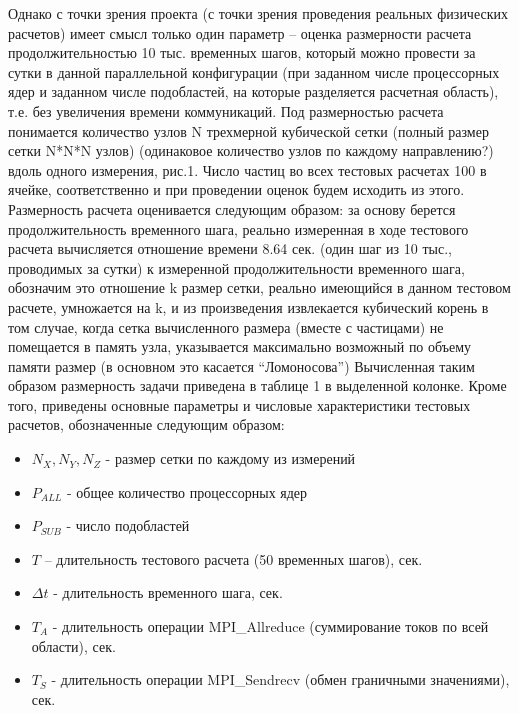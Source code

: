 Однако с точки зрения проекта (с точки зрения проведения реальных физических расчетов) имеет смысл только один параметр – оценка размерности расчета продолжительностью 10 тыс. временных шагов,  который можно провести за сутки в данной параллельной конфигурации (при заданном числе процессорных ядер и заданном числе подобластей, на которые разделяется расчетная область), т.е. без увеличения времени коммуникаций. Под размерностью расчета понимается количество узлов N трехмерной кубической сетки (полный размер сетки N*N*N узлов) (одинаковое количество узлов по каждому направлению?) вдоль одного измерения, рис.1. Число частиц во всех тестовых расчетах 100 в ячейке, соответственно и при проведении оценок будем исходить из этого. Размерность расчета оценивается следующим образом:
за основу берется продолжительность временного шага, реально измеренная в ходе тестового расчета
вычисляется отношение времени 8.64 сек. (один шаг из 10 тыс., проводимых за сутки) к измеренной продолжительности временного шага, обозначим это отношение k
размер сетки, реально имеющийся в данном тестовом расчете, умножается на k, и из произведения извлекается кубический корень
в том случае, когда сетка вычисленного размера (вместе с частицами) не помещается в память узла, указывается максимально возможный по объему памяти размер (в основном это касается “Ломоносова”)
Вычисленная таким образом размерность задачи приведена в таблице 1 в выделенной колонке. Кроме того, приведены основные параметры и числовые характеристики тестовых расчетов, обозначенные следующим образом:
\begin{itemize}
\item $N_X, N_Y, N_Z$  - размер сетки по каждому из измерений
\item $P_{ALL}$  - общее количество процессорных ядер
\item $P_{SUB}$  - число подобластей
\item $T$ – длительность тестового расчета (50 временных шагов), сек.
\item $\Delta t$  - длительность временного шага, сек.
\item $T_{A}$ - длительность операции MPI\_Allreduce (суммирование токов по всей области), сек.
\item $T_{S}$ - длительность операции MPI\_Sendrecv (обмен граничными значениями), сек.
\end{itemize}
	


